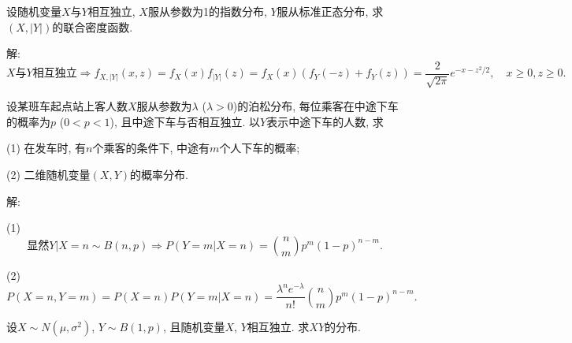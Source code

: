 \documentclass[standard]{ExBook}
\begin{document}
\begin{qitems}
\vspace{-5em}

    \begin{bbox}
    \begin{shaded}
        \qitem
设随机变量$X$与$Y$相互独立, $X$服从参数为1的指数分布, $Y$服从标准正态分布, 求$(X,|Y|)$的联合密度函数.
    \end{shaded}
    \end{bbox}

\vspace{-5em}

    \begin{bbox}
解: 
$$X\text{与}Y\text{相互独立} \Longrightarrow f_{X,|Y|}(x,z)=f_{X}(x)f_{|Y|}(z)=f_{X}(x)(f_{Y}(-z)+f_{Y}(z))=\frac{2}{\sqrt{2\pi}}e^{-x-z^2/2},\quad x\geq 0,z\geq 0.$$
    \end{bbox}

\vspace{-5em}

    \begin{bbox}
    \begin{shaded}
        \qitem
设某班车起点站上客人数$X$服从参数为$\lambda$ ($\lambda>0$)的泊松分布, 每位乘客在中途下车的概率为$p$ ($0 < p < 1$), 且中途下车与否相互独立. 以$Y$表示中途下车的人数, 求

(1) 在发车时, 有$n$个乘客的条件下, 中途有$m$个人下车的概率;

(2) 二维随机变量$(X,Y)$的概率分布.
    \end{shaded}
    \end{bbox}

\vspace{-5em}

    \begin{bbox}
解: 

(1) 
$$\text{显然}Y|X=n\sim B(n,p) \Longrightarrow P(Y=m|X=n)=\binom{n}{m}p^{m}(1-p)^{n-m}.$$

(2)
$$P(X=n,Y=m)=P(X=n)P(Y=m|X=n)=\frac{\lambda^{n}e^{-\lambda}}{n!}\binom{n}{m}p^{m}(1-p)^{n-m}.$$
    \end{bbox}

\vspace{-5em}

    \begin{bbox}
    \begin{shaded}
        \qitem
设$X\sim N(\mu,\sigma^2)$, $Y\sim B(1,p)$, 且随机变量$X$, $Y$相互独立. 求$XY$的分布.
    \end{shaded}
    \end{bbox}


\end{qitems}
\end{document}
